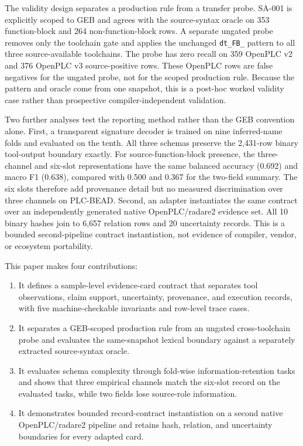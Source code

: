 \documentclass[manuscript,screen,review]{acmart}
\begin{document}
The validity design separates a production rule from a transfer probe. SA-001 is explicitly scoped to GEB and agrees with the source-syntax oracle on 353 function-block and 264 non-function-block rows. A separate ungated probe removes only the toolchain gate and applies the unchanged \texttt{dt\_FB\_} pattern to all three source-available toolchains. The probe has zero recall on 359 OpenPLC v2 and 376 OpenPLC v3 source-positive rows. These OpenPLC rows are false negatives for the ungated probe, not for the scoped production rule. Because the pattern and oracle come from one snapshot, this is a post-hoc worked validity case rather than prospective compiler-independent validation.

Two further analyses test the reporting method rather than the GEB convention alone. First, a transparent signature decoder is trained on nine inferred-name folds and evaluated on the tenth. All three schemas preserve the 2{,}431-row binary tool-output boundary exactly. For source-function-block presence, the three-channel and six-slot representations have the same balanced accuracy (0.692) and macro F1 (0.638), compared with 0.500 and 0.367 for the two-field summary. The six slots therefore add provenance detail but no measured discrimination over three channels on PLC-BEAD. Second, an adapter instantiates the same contract over an independently generated native OpenPLC/radare2 evidence set. All 10 binary hashes join to 6{,}657 relation rows and 20 uncertainty records. This is a bounded second-pipeline contract instantiation, not evidence of compiler, vendor, or ecosystem portability.

This paper makes four contributions:

\begin{enumerate}
\item It defines a sample-level evidence-card contract that separates tool observations, claim support, uncertainty, provenance, and execution records, with five machine-checkable invariants and row-level trace cases.
\item It separates a GEB-scoped production rule from an ungated cross-toolchain probe and evaluates the same-snapshot lexical boundary against a separately extracted source-syntax oracle.
\item It evaluates schema complexity through fold-wise information-retention tasks and shows that three empirical channels match the six-slot record on the evaluated tasks, while two fields lose source-role information.
\item It demonstrates bounded record-contract instantiation on a second native OpenPLC/radare2 pipeline and retains hash, relation, and uncertainty boundaries for every adapted card.
\end{enumerate}
\end{document}

